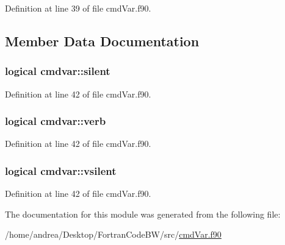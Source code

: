 Definition at line 39 of file cmd\-Var.\-f90.



\subsection{Member Data Documentation}
\hypertarget{classcmdvar_a774f2caff8f9563a52b69cf5c205da28}{
\subsubsection[{silent}]{\setlength{\rightskip}{0pt plus 5cm}logical cmdvar\-::silent}}\label{classcmdvar_a774f2caff8f9563a52b69cf5c205da28}


Definition at line 42 of file cmd\-Var.\-f90.

\hypertarget{classcmdvar_ab46a1faddb3f0a3fe76bfa461154ffcc}{
\subsubsection[{verb}]{\setlength{\rightskip}{0pt plus 5cm}logical cmdvar\-::verb}}\label{classcmdvar_ab46a1faddb3f0a3fe76bfa461154ffcc}


Definition at line 42 of file cmd\-Var.\-f90.

\hypertarget{classcmdvar_a5d5ef4d5f7d8f3ec8c8e390e0f594ec1}{
\subsubsection[{vsilent}]{\setlength{\rightskip}{0pt plus 5cm}logical cmdvar\-::vsilent}}\label{classcmdvar_a5d5ef4d5f7d8f3ec8c8e390e0f594ec1}


Definition at line 42 of file cmd\-Var.\-f90.



The documentation for this module was generated from the following file\-:\begin{DoxyCompactItemize}
\item 
/home/andrea/\-Desktop/\-Fortran\-Code\-B\-W/src/\hyperlink{cmd_var_8f90}{cmd\-Var.\-f90}\end{DoxyCompactItemize}
